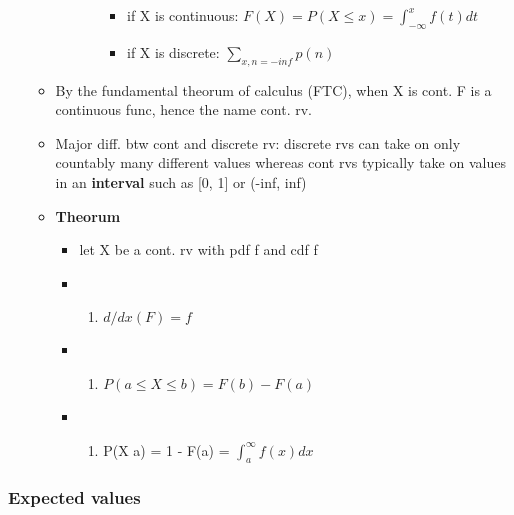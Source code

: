 \documentclass[
]{article}
\providecommand{\tightlist}{%
  \setlength{\itemsep}{0pt}\setlength{\parskip}{0pt}}
\begin{document}
\begin{itemize}
\begin{itemize}
\begin{itemize}
\begin{itemize}
        \begin{itemize}
        \tightlist
        \item
          if X is continuous:
          \(F(X) = P(X \leq x) = \int_{-\infty}^{x}f(t)dt\)
        \item
          if X is discrete: \(\sum_{x, n=-inf}p(n)\)
        \end{itemize}
      \end{itemize}
    \end{itemize}
  \item
    By the fundamental theorum of calculus (FTC), when X is cont. F is a
    continuous func, hence the name cont. rv.
  \item
    Major diff. btw cont and discrete rv: discrete rvs can take on only
    countably many different values whereas cont rvs typically take on
    values in an \textbf{interval} such as {[}0, 1{]} or (-inf, inf)
  \item
    \textbf{Theorum}

    \begin{itemize}
    \item
      let X be a cont. rv with pdf f and cdf f
    \item
      \begin{enumerate}
      \def\labelenumi{\arabic{enumi}.}
      \tightlist
      \item
        \(d/dx(F) = f\)
      \end{enumerate}
    \item
      \begin{enumerate}
      \def\labelenumi{\arabic{enumi}.}
      \setcounter{enumi}{1}
      \tightlist
      \item
        \(P(a \leq X \leq b) = F(b) - F(a)\)
      \end{enumerate}
    \item
      \begin{enumerate}
      \def\labelenumi{\arabic{enumi}.}
      \setcounter{enumi}{2}
      \tightlist
      \item
        P(X \geq a) = 1 - F(a) = \(\int_{a}^{\infty}f(x)dx\)
      \end{enumerate}
    \end{itemize}
  \end{itemize}
\end{itemize}

\hypertarget{expected-values}{%
\subsubsection{Expected values}\label{expected-values}}
\end{document}
